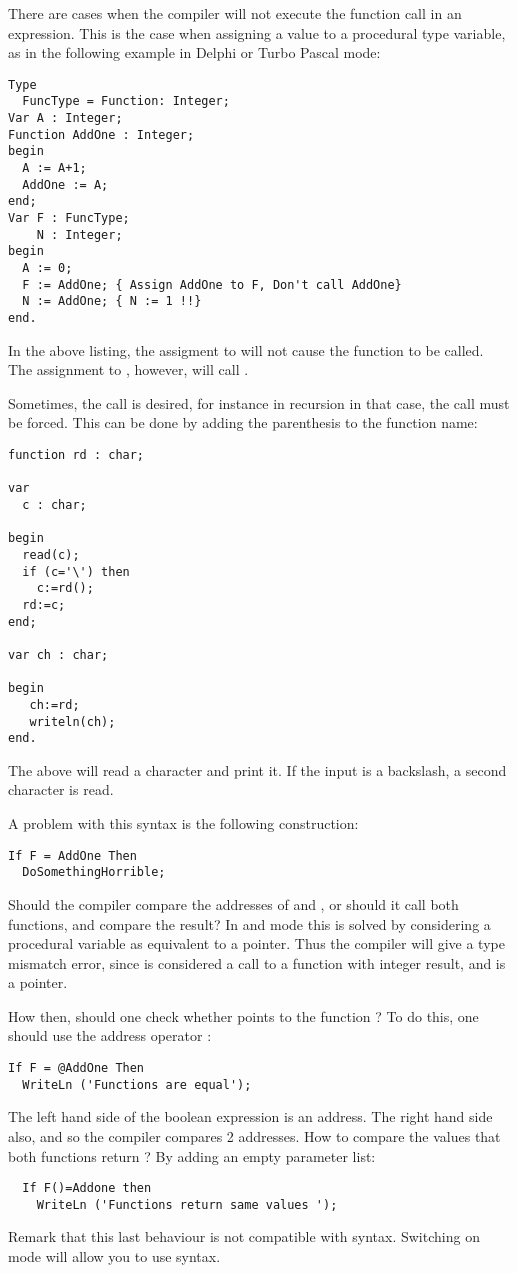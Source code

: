There are cases when the compiler will not execute the function call in an
expression. This is the case when assigning a value to a procedural
type variable, as in the following example in Delphi or Turbo Pascal mode:
\begin{verbatim}
Type
  FuncType = Function: Integer;
Var A : Integer;
Function AddOne : Integer;
begin
  A := A+1;
  AddOne := A;
end;
Var F : FuncType;
    N : Integer;
begin
  A := 0;
  F := AddOne; { Assign AddOne to F, Don't call AddOne}
  N := AddOne; { N := 1 !!}
end.
\end{verbatim}
In the above listing, the assigment to  will not cause the function
 to be called. The assignment to , however, will call
. 

Sometimes, the call is desired, for instance in recursion
in that case, the call must be forced. This can be done by adding the
parenthesis to the function name:
\begin{verbatim}
function rd : char;

var 
  c : char;

begin
  read(c);
  if (c='\') then 
    c:=rd();
  rd:=c;
end;

var ch : char;

begin
   ch:=rd;
   writeln(ch);
end.
\end{verbatim}
The above will read a character and print it. If the input is a backslash, a
second character is read.

A problem with this syntax is the following construction:
\begin{verbatim}
If F = AddOne Then
  DoSomethingHorrible;
\end{verbatim}
Should the compiler compare the addresses of  and ,
or should it call both functions, and compare the result? In  and
 mode this is solved by considering a procedural variable as
equivalent to a pointer. Thus the compiler will give a type mismatch error,
since  is considered a call to a function with integer result,
and  is a pointer.

How then, should one check whether  points to the function
? To do this, one should use the address operator :
\begin{verbatim}
If F = @AddOne Then
  WriteLn ('Functions are equal');
\end{verbatim}
The left hand side of the boolean expression is an address. The right hand
side also, and so the compiler compares 2 addresses.
How to compare the values that both functions return ? By adding an empty
parameter list:
\begin{verbatim}
  If F()=Addone then
    WriteLn ('Functions return same values ');
\end{verbatim}
Remark that this last behaviour is not compatible with \delphi syntax. 
Switching on  mode will allow you to use \delphi syntax.

